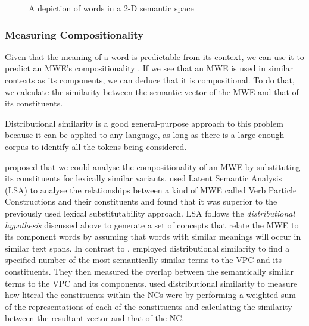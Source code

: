 \begin{figure}[!htb]
\begin{center}
\caption{A depiction of words in a 2-D semantic space}
\end{center}
\label{fig:dseg}
\end{figure}
\subsubsection{Measuring Compositionality}
Given that the meaning of a word is predictable from its context, we can use it to predict an MWE's compositionality \citep{Bannard2003,Mccarthy2003,Reddy2011}. If we see that an MWE is used in similar contexts as its components, we can deduce that it is compositional. To do that, we calculate the similarity between the semantic vector of the MWE and that of its constituents.

Distributional similarity is a good general-purpose approach to this problem because it can be applied to any language, as long as there is a large enough corpus to identify all the tokens being considered. 

\cite{Lin1999} proposed that we could analyse the compositionality of an MWE by substituting its constituents for lexically similar variants. \cite{Bannard2003} used Latent Semantic Analysis (LSA) to analyse the relationships between a kind of MWE called Verb Particle Constructions \citep{Wasow2003} and their constituents and found that it was superior to the previously used lexical substitutability approach. LSA follows the \textit{distributional hypothesis} discussed above to generate a set of concepts that relate the MWE to its component words by assuming that words with similar meanings will occur in similar text spans. In contrast to \cite{Bannard2003}, \cite{Mccarthy2003} employed distributional similarity to find a specified number of the most semantically similar terms to the VPC and its constituents. They then measured the overlap between the semantically similar terms to the VPC and its components. \cite{Reddy2011} used distributional similarity to measure how literal the constituents within the NCs were by performing a weighted sum of the representations of each of the constituents and calculating the similarity between the resultant vector and that of the NC.

